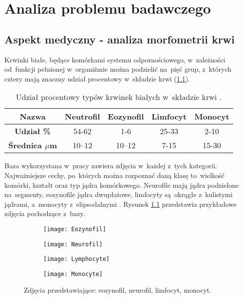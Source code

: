 \chapter{Analiza problemu badawczego}
\label{cha:analiza_problemu_badawczego}

\section{Aspekt medyczny - analiza morfometrii krwi}
Krwinki białe, będące komórkami systemu odpornościowego, w~zależności od~funkcji pełnionej w~organiźmie można podzielić na~pięć grup, z~których cztery mają znaczny udział procentowy w~składzie krwi (\ref{tab:blood_cells_percentage}).
\begin{table}[h!]
\centering
\caption[Short Heading]{Udział procentowy typów krwinek białych w~składzie krwi \cite{Wheater1979FunctionalHA}.}
\label{tab:blood_cells_percentage}
\begin{tabular}{|c|c|c|c|c|}
\hline
\textbf{Nazwa}                               & Neutrofil & Eozynofil & Limfocyt & Monocyt \\ \hline
\textbf{Udział \%} & 54-62   & 1-6    & 25-33  & 2-10  \\ \hline
\textbf{Średnica  \textbf{$\mu$}m} & 10–12  & 10–12 & 7-15  & 15-30  \\ \hline
\end{tabular}
\end{table}

{\parindent0pt %
Baza wykorzystana w~pracy zawiera zdjęcia w~każdej z~tych kategorii. Najważniejsze cechy, po~których można rozpoznać daną klasę to~wielkość komórki, kształt oraz typ jądra komórkowego. Neurofile mają jądra podzielone na~segmenty, eozynofile jądra dwupłatowe, limfocyty są~okrągłe z~kulistymi jądrami, a~monocyty z~elipsodalnymi \cite{lymphocytes_nucleus}. Rysunek \ref{fig:subcaption_example} przedstawia przykładowe zdjęcia pochodzące z~bazy.
\begin{figure}[h!]
	\centering
	\begin{subfigure}{0.35\textwidth}
		\centering
		\texttt{[image: Eozynofil]}
		\subcaption{\label{subfigure_a}}
	\end{subfigure}
	\begin{subfigure}{0.35\textwidth}
		\centering
		\texttt{[image: Neurofil]}
		\subcaption{\label{subfigure_b}}
	\end{subfigure}
	\begin{subfigure}{0.35\textwidth}
		\centering
		\texttt{[image: Lymphocyte]}
		\subcaption{\label{subfigure_c}}
	\end{subfigure}
	\begin{subfigure}{0.35\textwidth}
		\centering
		\texttt{[image: Monocyte]}
		\subcaption{\label{subfigure_d}}
	\end{subfigure}
	
	\caption{Zdjęcia przedstawiające: \protect{} eozynofil, \protect{} neurofil,  \protect{} limfocyt,  \protect{} monocyt.}
	\label{fig:subcaption_example}
\end{figure}
}

